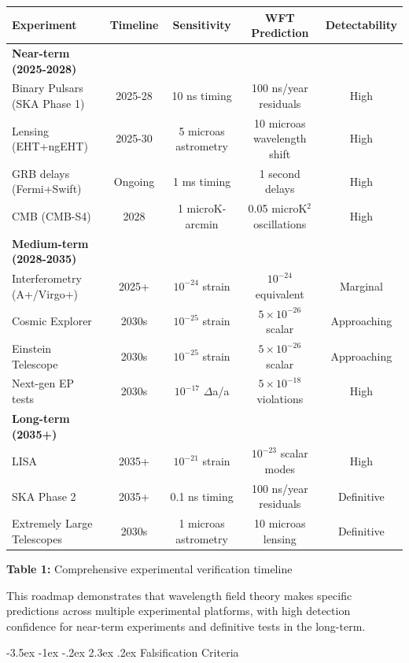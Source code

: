 \documentclass[10pt,twocolumn]{article}
\makeatletter
\renewcommand\section{\@startsection{section}{1}{\z@}%
  {-3.5ex \@plus -1ex \@minus -.2ex}%
  {2.3ex \@plus.2ex}%
  {\normalfont\large\bfseries}}
\makeatother
\begin{document}
\begin{center}
\begin{tabular}{lcccc}
\toprule
Experiment & Timeline & Sensitivity & WFT Prediction & Detectability \\
\midrule
\textbf{Near-term (2025-2028)} & & & & \\
Binary Pulsars (SKA Phase 1) & 2025-28 & 10 ns timing & 100 ns/year residuals & High \\
Lensing (EHT+ngEHT) & 2025-30 & 5 microas astrometry & 10 microas wavelength shift & High \\
GRB delays (Fermi+Swift) & Ongoing & 1 ms timing & 1 second delays & High \\
CMB (CMB-S4) & 2028 & 1 microK-arcmin & 0.05 microK$^2$ oscillations & High \\
\midrule
\textbf{Medium-term (2028-2035)} & & & & \\
Interferometry (A+/Virgo+) & 2025+ & $10^{-24}$ strain & $10^{-24}$ equivalent & Marginal \\
Cosmic Explorer & 2030s & $10^{-25}$ strain & $5 \times 10^{-26}$ scalar & Approaching \\
Einstein Telescope & 2030s & $10^{-25}$ strain & $5 \times 10^{-26}$ scalar & Approaching \\
Next-gen EP tests & 2030s & $10^{-17}$ $\Delta$a/a & $5 \times 10^{-18}$ violations & High \\
\midrule
\textbf{Long-term (2035+)} & & & & \\
LISA & 2035+ & $10^{-21}$ strain & $10^{-23}$ scalar modes & High \\
SKA Phase 2 & 2035+ & 0.1 ns timing & 100 ns/year residuals & Definitive \\
Extremely Large Telescopes & 2030s & 1 microas astrometry & 10 microas lensing & Definitive \\
\bottomrule
\end{tabular}

\vspace{0.5em}
\textbf{Table 1:} Comprehensive experimental verification timeline
\end{center}

This roadmap demonstrates that wavelength field theory makes specific predictions across multiple experimental platforms, with high detection confidence for near-term experiments and definitive tests in the long-term.

\clearpage

\section{Falsification Criteria}
\end{document}

